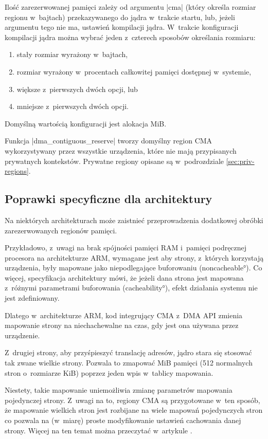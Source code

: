 Ilość zarezerwowanej pamięci zależy od argumentu \code|cma|
(który określa rozmiar regionu w~bajtach) przekazywanego do jądra
w~trakcie startu, lub, jeżeli argumentu tego nie ma, ustawień
kompilacji jądra.  W~trakcie konfiguracji kompilacji jądra można
wybrać jeden z~czterech sposobów określania rozmiaru:

\begin{enumerate}
\item stały rozmiar wyrażony w~bajtach,
\item rozmiar wyrażony w~procentach całkowitej pamięci dostępnej
  w~systemie,
\item większe z~pierwszych dwóch opcji, lub
\item mniejsze z~pierwszych dwóch opcji.
\end{enumerate}

Domyślną wartością konfiguracji jest alokacja \unit[16]{MiB}.

Funkcja \code|dma_contiguous_reserve| tworzy domyślny region CMA
wykorzystywany przez wszystkie urządzenia, które nie mają przypisanych
prywatnych kontekstów.  Prywatne regiony opisane są w~podrozdziale
\ref{sec:priv-regions}.


\subsection{Poprawki specyficzne dla architektury}

Na niektórych architekturach może zaistnieć przeprowadzenia dodatkowej
obróbki zarezerwowanych regionów pamięci.

Przykładowo, z~uwagi na brak spójności pamięci RAM i~pamięci
podręcznej procesora na architekturze ARM, wymagane jest aby strony,
z~których korzystają urządzenia, były mapowane jako niepodlegające
buforowaniu (\ang{noncacheable}).  Co więcej, specyfikacja
architektury mówi, że jeżeli dana strona jest mapowana z~różnymi
parametrami buforowania (\ang{cacheability}), efekt działania systemu
nie jest zdefiniowany.

Dlatego w~architekturze ARM, kod integrujący CMA z~DMA API zmienia
mapowanie strony na niechachewalne na czas, gdy jest ona używana przez
urządzenie.

Z~drugiej strony, aby przyśpieszyć translację adresów, jądro stara się
stosować tak zwane wielkie strony.  Pozwala to zmapować \unit[2]{MiB}
pamięci (512 normalnych stron o~rozmiarze \unit[4]{KiB}) poprzez jeden
wpis w~tablicy mapowania.

Niestety, takie mapowanie uniemożliwia zmianę parametrów mapowania
pojedynczej strony.  Z~uwagi na to, regiony CMA są przygotowane w~ten
sposób, że mapowanie wielkich stron jest rozbijane na wiele mapowań
pojedynczych stron co pozwala na (w~miarę) proste modyfikowanie
ustawień cachowania danej strony.  Więcej na ten temat można
przeczytać w~artykule \cite{bib:cma-and-arm}.


